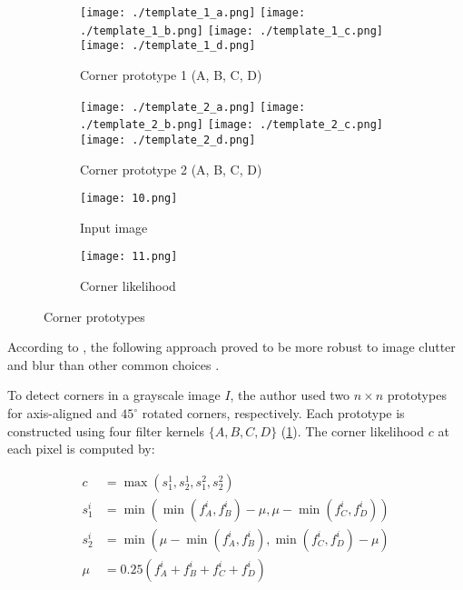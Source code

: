 \begin{figure}[h]
	\centering

	\begin{subfigure}{0.45\textwidth}
		\centering
		\begin{minipage}{\textwidth}
			\texttt{[image: ./template\_1\_a.png]}
			\texttt{[image: ./template\_1\_b.png]}
			\texttt{[image: ./template\_1\_c.png]}
			\texttt{[image: ./template\_1\_d.png]}
		\end{minipage}
		\caption{Corner prototype 1 (A, B, C, D)}
	\end{subfigure}
	\hfill
	\begin{subfigure}{0.45\textwidth}
		\centering
		\begin{minipage}{\textwidth}
			\texttt{[image: ./template\_2\_a.png]}
			\texttt{[image: ./template\_2\_b.png]}
			\texttt{[image: ./template\_2\_c.png]}
			\texttt{[image: ./template\_2\_d.png]}
		\end{minipage}
		\caption{Corner prototype 2 (A, B, C, D)}
	\end{subfigure}
	\begin{subfigure}{0.3\linewidth}
		\texttt{[image: 10.png]}
		\caption{Input image}
	\end{subfigure}
	\begin{subfigure}{0.3\linewidth}
		\texttt{[image: 11.png]}
		\caption{Corner likelihood}
	\end{subfigure}

	\caption{Corner prototypes \citep{geigerAutomaticCameraRange2012}}
	\label{fig:corner_prototypes}
\end{figure}

According to \cite{geigerAutomaticCameraRange2012}, the following approach proved to be
more robust to image clutter and blur than other common choices
\citep{harrisCombinedCornerEdge1988, shiGoodFeaturesTrack2000}.

To detect corners in a grayscale image $I$, the author used two $n \times n$ prototypes
for axis-aligned and $45^{\circ}$ rotated corners, respectively.
Each prototype
is constructed using four filter kernels $\{A, B, C, D\}$ (\cref{fig:corner_prototypes}). The corner likelihood
$c$ at each pixel is computed by:

\begin{equation}
	\begin{aligned}
		c     & =\max \left(s_1^1, s_2^1, s_1^2, s_2^2\right)                                             \\
		s_1^i & =\min \left(\min \left(f_A^i, f_B^i\right)-\mu, \mu-\min \left(f_C^i, f_D^i\right)\right) \\
		s_2^i & =\min \left(\mu-\min \left(f_A^i, f_B^i\right), \min \left(f_C^i, f_D^i\right)-\mu\right) \\
		\mu   & =0.25\left(f_A^i+f_B^i+f_C^i+f_D^i\right)
	\end{aligned}
\end{equation}


